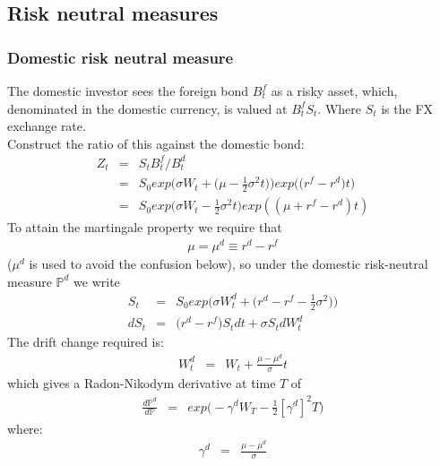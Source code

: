 \subsection{Risk neutral measures}

\subsubsection{Domestic risk neutral measure}
The domestic investor sees the foreign bond $B_{t}^{f}$ as a risky asset, which, denominated in the domestic currency, is valued at $B_{t}^{f}S_{t}$. Where $S_{t}$ is the FX exchange rate.\\
Construct the ratio of this against the domestic bond:
\begin{eqnarray}
	\nonumber
	Z_{t} &=& S_{t}B_{t}^{f} / B_{t}^{d}\\
	\nonumber
	  &=& S_{0}exp\bigg(\sigma W_{t} + \bigg(\mu -\frac{1}{2}\sigma^{2}t\bigg)\bigg)exp\bigg(\bigg(r^{f} - r^{d}\bigg)t\bigg)\\
	  &=& S_{0}exp\bigg(\sigma W_{t} - \frac{1}{2}\sigma^{2}t\bigg)exp((\mu + r^{f} - r^{d})t)
\end{eqnarray}
To attain the martingale property we require that
\begin{eqnarray}
\mu = \mu^{d} \equiv r^{d} - r^{f}
\end{eqnarray}
($\mu^{d}$ is used to avoid the confusion below), so under the domestic risk-neutral measure $\mathbb{P}^{d}$ we write
\begin{eqnarray}
	S_{t} &=& S_{0}exp\bigg(\sigma W_{t}^{d} + \bigg(r^{d} - r^{f} - \frac{1}{2}\sigma^{2}\bigg)\bigg)\\
	dS_{t} &=& \bigg(r^{d} - r^{f}\bigg)S_{t}dt + \sigma S_{t}dW_{t}^{d}
\end{eqnarray}
The drift change required is:
\begin{eqnarray}
	W_{t}^{d} &=& W_{t} + \frac{\mu - \mu^{d}}{\sigma}t
\end{eqnarray}
which gives a Radon-Nikodym derivative at time $T$ of
\begin{eqnarray}
\frac{d\mathbb{P}^{d}}{d\mathbb{P}} &=& exp\bigg(-\gamma^{d}W_{T} - \frac{1}{2}[\gamma^{d}]^{2}T\bigg)
\end{eqnarray}
where:
\begin{eqnarray}
\gamma^{d} &=& \frac{\mu - \mu^{d}}{\sigma}
\end{eqnarray}

